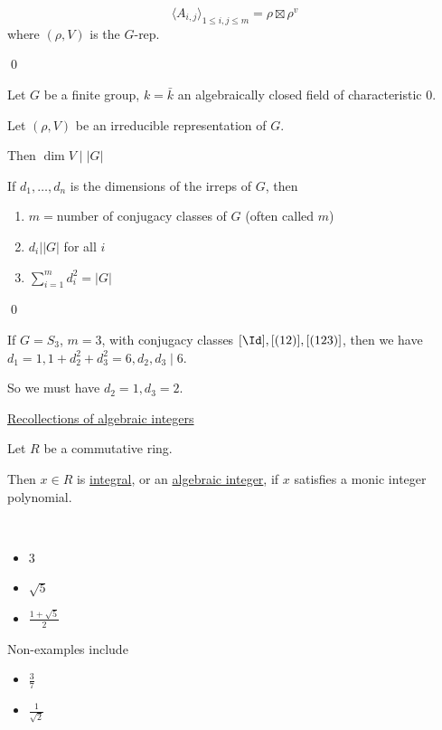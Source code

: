 \documentclass[x11names,reqno,14pt]{extarticle}
\newcommand{\bark}{\bar{k}}
\begin{document}
\thm
\[
\langle A_{i,j}\rangle_{1\leq i, j\leq m} = \rho\boxtimes\rho^v
\]
where $(\rho,V)$ is the $G$-rep.

\proof

\qed

\thm

Let $G$ be a finite group, $k = \bark$ an algebraically closed field of characteristic 0. 

Let $(\rho,V)$ be an irreducible representation of $G$. 

Then $\dim V \mid |G|$

\proof

\cor

If $d_1, \dots, d_n$ is the dimensions of the irreps of $G$, then 
\begin{enumerate}

\item $m = $number of conjugacy classes of $G$ (often called $m$)

\item $d_i | |G|$ for all $i$

\item $\sum_{i=1}^m d_i^2 = |G|$

\end{enumerate}

\proof

\qed

\exm

If $G = S_3$, $m = 3$, with conjugacy classes $[\Id], [(12)],[(123)]$, then we have $d_1 = 1, 1 + d_2^2 + d_3^2 = 6, d_2, d_3 \mid 6$. 

So we must have $d_2 = 1, d_3 = 2$. 

\underline{Recollections of algebraic integers}


Let $R$ be a commutative ring. 

Then $x \in R$ is \underline{integral}, or an \underline{algebraic integer}, if $x$ satisfies a monic integer polynomial. 

\exm
\,
\begin{itemize}

\item 3

\item $\sqrt{5}$

\item $\frac{1+\sqrt{5}}{2}$

\end{itemize}

Non-examples include
\begin{itemize}

\item $\frac37$

\item $\frac{1}{\sqrt{2}}$

\end{itemize}
\end{document}
